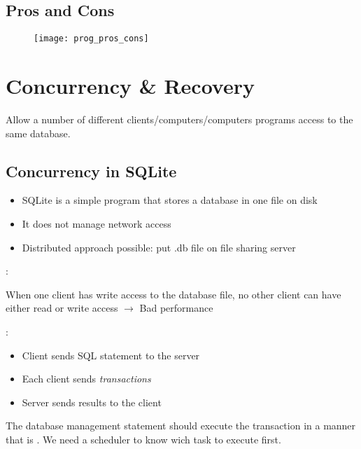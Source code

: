 \section{Pros and Cons}

\begin{figure}[H]
    \centering
    \texttt{[image: prog\_pros\_cons]}
\end{figure}

\chapter{Concurrency \& Recovery}

Allow a number of different clients/computers/computers programs access to the same database.

\section{Concurrency in SQLite}

\begin{itemize}
    \item SQLite is a simple program that stores a database in one file on disk
    \item It does not manage network access
    \item Distributed approach possible: put .db file on file sharing server
\end{itemize}

\begin{minipage}{0.48\textwidth}
 :

When one client has write access to the database file, no other client can have either read or write access $\rightarrow$ Bad performance
\end{minipage}
\hfill
\begin{minipage}{0.48\textwidth}
 :
\begin{itemize}
    \item Client sends SQL statement to the server
    \item Each client sends \textit{transactions}
    \item Server sends results to the client
\end{itemize}
\end{minipage}

The database management statement should execute the transaction in a manner that is . We need a scheduler to know wich task to execute first.


